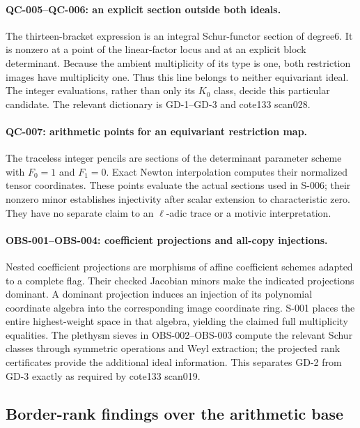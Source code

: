 \paragraph{QC-005--QC-006: an explicit section outside both ideals.}
The thirteen-bracket expression is an integral Schur-functor section
of degree6. It is nonzero at a point of the linear-factor locus and at
an explicit block determinant. Because the ambient multiplicity of
its type is one, both restriction images have multiplicity one.
Thus this line belongs to neither equivariant ideal. The integer
evaluations, rather than only its $K_0$ class, decide this particular
candidate. The relevant dictionary is GD-1--GD-3 and cote133 scan028.

\paragraph{QC-007: arithmetic points for an equivariant restriction map.}
The traceless integer pencils are sections of the determinant parameter
scheme with $F_0=1$ and $F_1=0$. Exact Newton interpolation computes
their normalized tensor coordinates. These points evaluate the actual
sections used in S-006; their nonzero minor establishes injectivity
after scalar extension to characteristic zero. They have no separate
claim to an $\ell$-adic trace or a motivic interpretation.

\paragraph{OBS-001--OBS-004: coefficient projections and all-copy injections.}
Nested coefficient projections are morphisms of affine coefficient
schemes adapted to a complete flag. Their checked Jacobian minors
make the indicated projections dominant. A dominant projection induces
an injection of its polynomial coordinate algebra into the corresponding
image coordinate ring. S-001 places the entire highest-weight space
in that algebra, yielding the claimed full multiplicity equalities.
The plethysm sieves in OBS-002--OBS-003 compute the relevant Schur
classes through symmetric operations and Weyl extraction; the projected
rank certificates provide the additional ideal information. This
separates GD-2 from GD-3 exactly as required by cote133 scan019.

\subsection{Border-rank findings over the arithmetic base}

